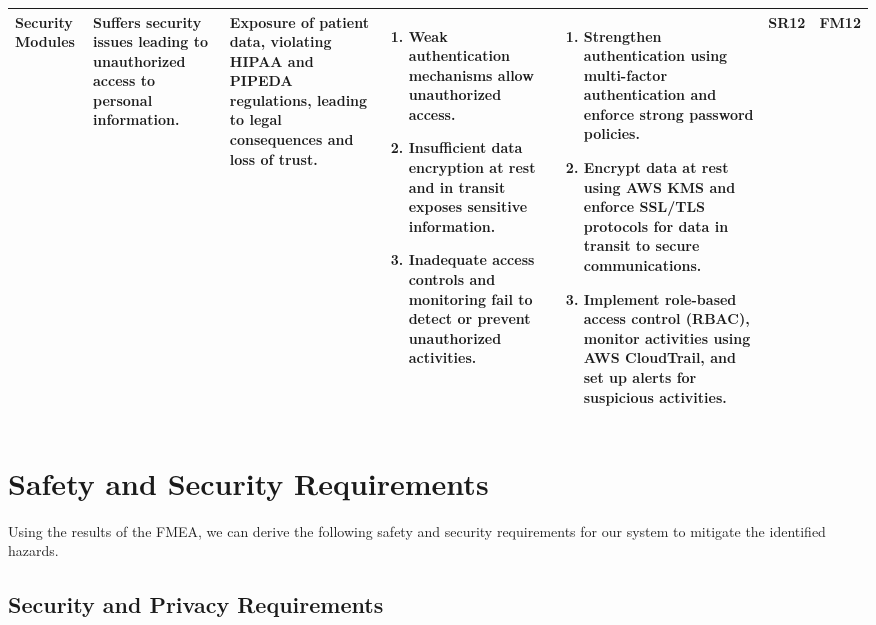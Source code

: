 \documentclass{article}
\begin{document}
\begin{landscape}
\begin{table}[ht]
{\begin{tabular}{|p{2.5cm}|p{2.5cm}|p{3cm}|p{5cm}|p{6cm}|p{1cm}|p{1cm}|}
    Security Modules
     & Suffers security issues leading to unauthorized access to personal information.
     & Exposure of patient data, violating HIPAA and PIPEDA regulations, leading to legal consequences and loss of trust.
     &
     \begin{enumerate}[leftmargin=*, label={\alph*.}, itemsep=1pt]
         \item Weak authentication mechanisms allow unauthorized access.
         \item Insufficient data encryption at rest and in transit exposes sensitive information.
         \item Inadequate access controls and monitoring fail to detect or prevent unauthorized activities.
     \end{enumerate}
     &
     \begin{enumerate}[leftmargin=*, label={\alph*.}, itemsep=1pt]
         \item Strengthen authentication using multi-factor authentication and enforce strong password policies.
         \item Encrypt data at rest using AWS KMS and enforce SSL/TLS protocols for data in transit to secure communications.
         \item Implement role-based access control (RBAC), monitor activities using AWS CloudTrail, and set up alerts for suspicious activities.
     \end{enumerate}
     & SR12 & FM12 \\ \hline

    \end{tabular}
    }
    \end{table}
\end{landscape}







\section{Safety and Security Requirements}

Using the results of the FMEA, we can derive the following safety and security requirements for our system to mitigate the identified hazards.

\subsection{Security and Privacy Requirements}
\end{document}

